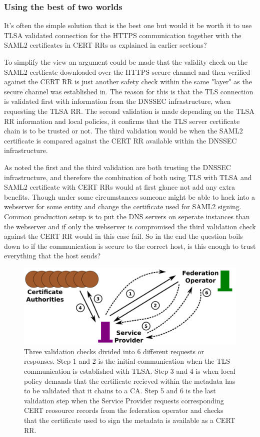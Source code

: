 \subsubsection{Using the best of two worlds}
It's often the simple solution that is the best one but would it be worth it to use TLSA validated connection for the HTTPS communication together with the SAML2 certificates in CERT RRs as explained in earlier sections?

To simplify the view an argument could be made that the validity check on the SAML2 certficate downloaded over the HTTPS secure channel and then verified against the CERT RR is just another safety check within the same "layer" as the secure channel was established in.
The reason for this is that the TLS connection is validated first with information from the DNSSEC infrastructure, when requesting the TLSA RR.
The second validation is made depending on the TLSA RR information and local policies, it confirms that the TLS server certificate chain is to be trusted or not.
The third validation would be when the SAML2 certificate is compared against the CERT RR available within the DNSSEC infrastructure.

As noted the first and the third validation are both trusting the DNSSEC infrastructure, and therefore the combination of both using TLS with TLSA and SAML2 certificate with CERT RRs would at first glance not add any extra benefits.
Though under some circumstances someone might be able to hack into a webserver for some entity and change the certificate used for SAML2 signing.
Common production setup is to put the DNS servers on seperate instances than the webserver and if only the webserver is compromised the third validation check against the CERT RR would in this case fail.
So in the end the question boils down to if the communication is secure to the correct host, is this enough to trust everything that the host sends?

\begin{figure}[ht]
\begin{center}
\includegraphics[scale=1]{Figures/bestOfTwoWorlds.png}
\end{center}
\caption{Three validation checks divided into 6 different requests or responses.
Step 1 and 2 is the initial communication when the TLS communication is established with TLSA.
Step 3 and 4 is when local policy demands that the certificate recieved within the metadata has to be validated that it chains to a CA.
Step 5 and 6 is the last validation step when the Service Provider requests corresponding CERT reosource records from the federation operator and checks that the certificate used to sign the metadata is available as a CERT RR.
\label{ch4:bestOfTwoWorlds}}
\end{figure}

